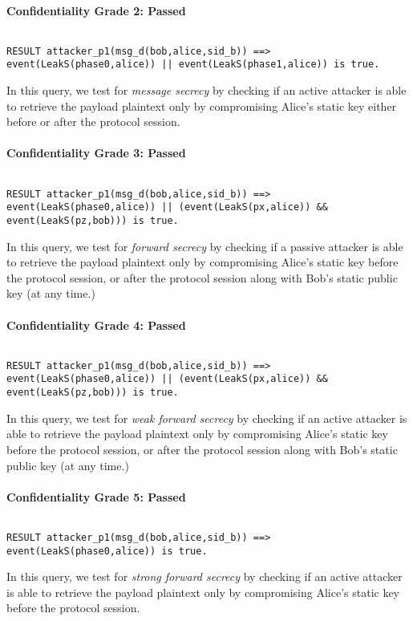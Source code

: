 \paragraph{Confidentiality Grade 2: Passed}$ $
\begin{lstlisting}
RESULT attacker_p1(msg_d(bob,alice,sid_b)) ==> event(LeakS(phase0,alice)) || event(LeakS(phase1,alice)) is true.
\end{lstlisting}

In this query, we test for \emph{message secrecy} by checking if an active attacker is able to retrieve the payload plaintext only by compromising Alice's static key either before or after the protocol session.


\paragraph{Confidentiality Grade 3: Passed}$ $
\begin{lstlisting}
RESULT attacker_p1(msg_d(bob,alice,sid_b)) ==> event(LeakS(phase0,alice)) || (event(LeakS(px,alice)) && event(LeakS(pz,bob))) is true.
\end{lstlisting}

In this query, we test for \emph{forward secrecy} by checking if a passive attacker is able to retrieve the payload plaintext only by compromising Alice's static key before the protocol session, or after the protocol session along with Bob's static public key (at any time.)


\paragraph{Confidentiality Grade 4: Passed}$ $
\begin{lstlisting}
RESULT attacker_p1(msg_d(bob,alice,sid_b)) ==> event(LeakS(phase0,alice)) || (event(LeakS(px,alice)) && event(LeakS(pz,bob))) is true.
\end{lstlisting}

In this query, we test for \emph{weak forward secrecy} by checking if an active attacker is able to retrieve the payload plaintext only by compromising Alice's static key before the protocol session, or after the protocol session along with Bob's static public key (at any time.)


\paragraph{Confidentiality Grade 5: Passed}$ $
\begin{lstlisting}
RESULT attacker_p1(msg_d(bob,alice,sid_b)) ==> event(LeakS(phase0,alice)) is true.
\end{lstlisting}

In this query, we test for \emph{strong forward secrecy} by checking if an active attacker is able to retrieve the payload plaintext only by compromising Alice's static key before the protocol session.


